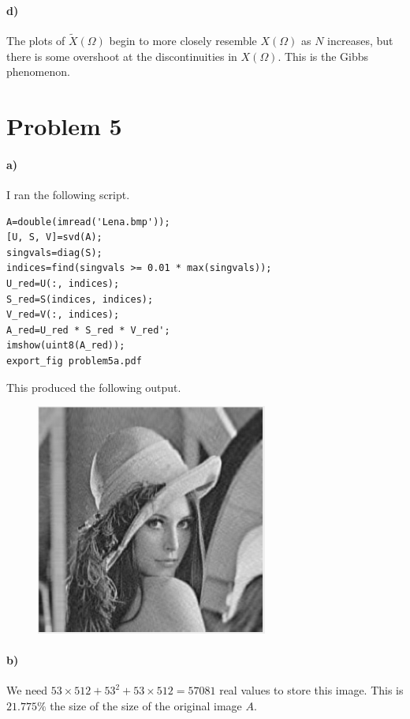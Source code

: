 \documentclass[12pt]{article}
\begin{document}
\paragraph{d)}

The plots of \(\tilde{X}(\Omega)\) begin to more closely resemble \(X(\Omega)\) as \(N\) increases, but there is
some overshoot at the discontinuities in \(X(\Omega)\). This is the Gibbs phenomenon.

\section*{Problem 5}

\paragraph{a)}

I ran the following script.
\begin{verbatim}
A=double(imread('Lena.bmp'));
[U, S, V]=svd(A);
singvals=diag(S);
indices=find(singvals >= 0.01 * max(singvals));
U_red=U(:, indices);
S_red=S(indices, indices);
V_red=V(:, indices);
A_red=U_red * S_red * V_red';
imshow(uint8(A_red));
export_fig problem5a.pdf
\end{verbatim}
This produced the following output.
\begin{figure}[H]
    \begin{center}
        \includegraphics[width=3in]{problem5a.pdf}
    \end{center}
\end{figure}

\paragraph{b)}

We need \(53\times 512 + 53^2 + 53\times 512 = 57081\) real values to store this image. This is \(21.775\%\) the size
of the size of the original image \(A\).
\end{document}

